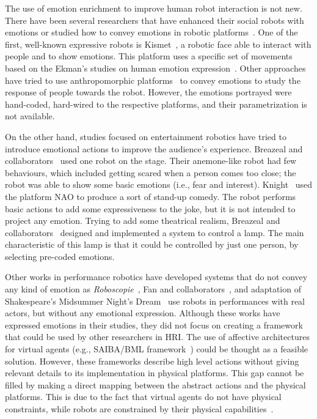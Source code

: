 The use of emotion enrichment to improve human robot interaction is not new. There have been several researchers that have enhanced their social robots with emotions or studied how to convey emotions in robotic platforms~\cite{Li2011,Brown2014}. One of the first, well-known expressive robots is Kismet~\cite{Breazeal2002}, a robotic face able to interact with people and to show emotions. This platform uses a specific set of movements based on the Ekman's studies on human emotion expression~\cite{Ekman2004}. Other approaches have tried to use anthropomorphic platforms~\cite{Arras2012} to convey emotions to study the response of people towards the robot. However, the emotions portrayed were hand-coded, hard-wired to the respective platforms, and their parametrization is not available.

On the other hand, studies focused on entertainment robotics have tried to introduce emotional actions to improve the audience's experience. Breazeal and collaborators~\cite{Breazeal2003} used one robot on the stage. Their anemone-like robot had few behaviours, which included getting scared when a person comes too close; the robot was able to show some basic emotions (i.e., fear and interest). Knight~\cite{Knight2011b} used the platform NAO to produce a sort of stand-up comedy. The robot performs basic actions to add some expressiveness to the joke, but it is not intended to project any emotion. Trying to add some theatrical realism, Breazeal and collaborators~\cite{Breazeal2008} designed and implemented a system to control a lamp. The main characteristic of this lamp is that it could be controlled by just one person, by selecting pre-coded emotions.

Other works in performance robotics have developed systems that do not convey any kind of emotion as \textit{Roboscopie}~\cite{Roboscopie2012}, Fan and collaborators~\cite{Fan2009}, and adaptation of Shakespeare's  Midsummer Night's Dream~\cite{murphy2011} use robots in performances with real actors, but without any emotional expression. Although these works have expressed emotions in their studies, they did not focus on creating a framework that could be used by other researchers in HRI. The use of affective architectures for virtual agents (e.g., SAIBA/BML framework~\cite{Kopp2006}) could be thought as a feasible solution. However, these frameworks describe high level actions without giving relevant details to its implementation in physical platforms. This gap cannot be filled by making a direct mapping between the abstract actions and the physical platforms. This is due to the fact that virtual agents do not have physical constraints, while robots are constrained by their physical capabilities~\cite{Saerbeck2007,Canamero2010}. 
